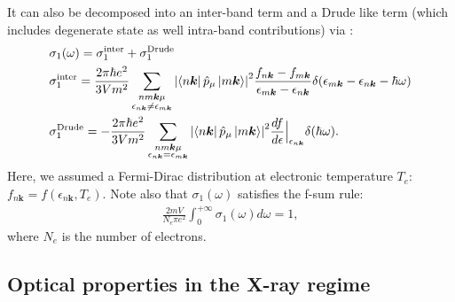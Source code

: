 \documentclass[a4,12pts]{extarticle}
\begin{document}
It can also be decomposed into an inter-band term and a Drude like term (which includes degenerate state as well intra-band contributions) via \cite{Calderin2017}:
\begin{align}
&\sigma_1(\omega)=\sigma_1^{\text{inter}}+\sigma_1^{\text{Drude}} \label{sig_decompo}\\
&\sigma_1^{\text{inter}}=\frac{2\pi\hbar e^{2}}{3Vm^2}\sum_{\substack{nm\boldsymbol{k}\mu\\ \epsilon_{n\boldsymbol{k}}\neq \epsilon_{m\boldsymbol{k}}}}\abs{\bra{n\boldsymbol{k}}\hat{p}_{\mu}\ket{m\boldsymbol{k}}}^{2}\frac{f_{n\boldsymbol{k}}-f_{m\boldsymbol{k}}}{\epsilon_{m\boldsymbol{k}}-\epsilon_{n\boldsymbol{k}}}\delta(\epsilon_{m\boldsymbol{k}}-\epsilon_{n\boldsymbol{k}}-\hbar\omega) \label{sig_inter}\\
&\sigma_1^{\text{Drude}}=-\frac{2\pi\hbar e^{2}}{3Vm^2}\sum_{\substack{nm\boldsymbol{k}\mu\\ \epsilon_{n\boldsymbol{k}}= \epsilon_{m\boldsymbol{k}}}}\abs{\bra{n\boldsymbol{k}}\hat{p}_{\mu}\ket{m\boldsymbol{k}}}^{2}\frac{df}{d\epsilon}\Bigr|_{\epsilon_{n\boldsymbol{k}}}  \delta(\hbar\omega). \label{sig_drude}
\end{align}
Here, we assumed a Fermi-Dirac distribution at electronic temperature $T_e$: $f_{n\boldsymbol{k}}=f(\epsilon_{n\boldsymbol{k}},T_e)$. Note also that $\sigma_1(\omega)$ satisfies the f-sum rule:
\begin{align}\label{sumrule}
\frac{2mV}{N_e\pi e^2}\int_{0}^{+\infty}\sigma_{1}(\omega)d\omega=1,
\end{align}
where $N_e$ is the number of electrons.

\subsection{Optical properties in the X-ray regime} \label{Core}
\end{document}
